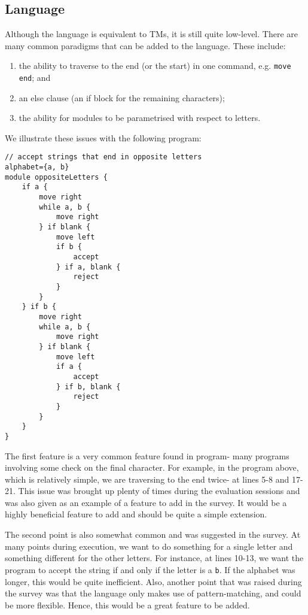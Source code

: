 \subsection{Language}
Although the language is equivalent to TMs, it is still quite low-level. There are many common paradigms that can be added to the language. These include:
\begin{enumerate}
    \item the ability to traverse to the end (or the start) in one command, e.g. \texttt{move end}; and
    \item an else clause (an if block for the remaining characters); 
    \item the ability for modules to be parametrised with respect to letters.
\end{enumerate}
We illustrate these issues with the following program:
\begin{lstlisting}[language=TML]
// accept strings that end in opposite letters
alphabet={a, b}
module oppositeLetters {
    if a {
        move right
        while a, b {
            move right
        } if blank {
            move left
            if b {
                accept
            } if a, blank {
                reject
            }
        }
    } if b {
        move right
        while a, b {
            move right
        } if blank {
            move left
            if a {
                accept
            } if b, blank {
                reject
            }
        }
    }
}
\end{lstlisting}

The first feature is a very common feature found in program- many programs involving some check on the final character. For example, in the program above, which is relatively simple, we are traversing to the end twice- at lines 5-8 and 17-21. This issue was brought up plenty of times during the evaluation sessions and was also given as an example of a feature to add in the survey. It would be a highly beneficial feature to add and should be quite a simple extension.

The second point is also somewhat common and was suggested in the survey. At many points during execution, we want to do something for a single letter and something different for the other letters. For instance, at lines 10-13, we want the program to accept the string if and only if the letter is a \texttt{b}. If the alphabet was longer, this would be quite inefficient. Also, another point that was raised during the survey was that the language only makes use of pattern-matching, and could be more flexible. Hence, this would be a great feature to be added. 

